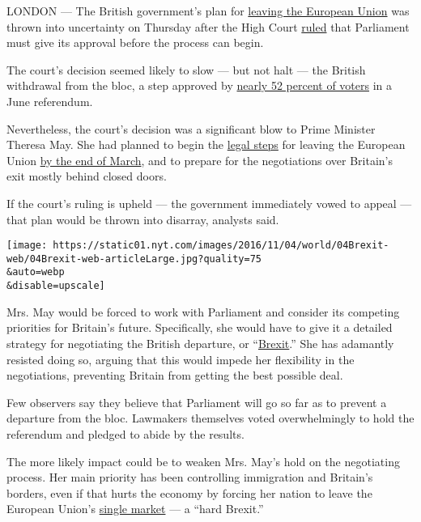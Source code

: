 LONDON --- The British government's plan for
\href{http://www.nytimes.com/2016/06/21/world/europe/brexit-britain-eu-explained.html}{leaving
the European Union} was thrown into uncertainty on Thursday after the
High Court
\href{https://www.judiciary.gov.uk/judgments/r-miller-v-secretary-of-state-for-exiting-the-european-union/}{ruled}
that Parliament must give its approval before the process can begin.

The court's decision seemed likely to slow --- but not halt --- the
British withdrawal from the bloc, a step approved by
\href{http://www.bbc.com/news/politics/eu_referendum/results}{nearly 52
percent of voters} in a June referendum.

Nevertheless, the court's decision was a significant blow to Prime
Minister Theresa May. She had planned to begin the
\href{http://www.nytimes.com/2016/11/04/world/europe/what-is-article-50-brexit-uk.html}{legal
steps} for leaving the European Union
\href{http://www.nytimes.com/2016/10/03/world/europe/brexit-talks-march-theresa-may-britain.html}{by
the end of March}, and to prepare for the negotiations over Britain's
exit mostly behind closed doors.

If the court's ruling is upheld --- the government immediately vowed to
appeal --- that plan would be thrown into disarray, analysts said.

\texttt{[image: https://static01.nyt.com/images/2016/11/04/world/04Brexit-web/04Brexit-web-articleLarge.jpg?quality=75\\\&auto=webp\\\&disable=upscale]}

Mrs. May would be forced to work with Parliament and consider its
competing priorities for Britain's future. Specifically, she would have
to give it a detailed strategy for negotiating the British departure, or
``\href{http://www.nytimes.com/2016/06/21/world/europe/brexit-britain-eu-explained.html}{Brexit}.''
She has adamantly resisted doing so, arguing that this would impede her
flexibility in the negotiations, preventing Britain from getting the
best possible deal.

Few observers say they believe that Parliament will go so far as to
prevent a departure from the bloc. Lawmakers themselves voted
overwhelmingly to hold the referendum and pledged to abide by the
results.

The more likely impact could be to weaken Mrs. May's hold on the
negotiating process. Her main priority has been controlling immigration
and Britain's borders, even if that hurts the economy by forcing her
nation to leave the European Union's
\href{https://ec.europa.eu/growth/single-market_en}{single market} --- a
``hard Brexit.''

